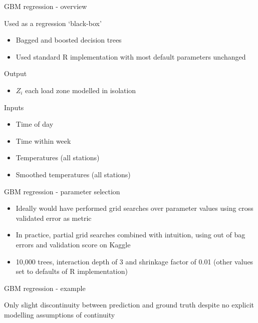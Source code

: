 \begin{frame}{GBM regression - overview}
  \begin{block}{Used as a regression `black-box'}
    \begin{itemize}
      \item Bagged and boosted decision trees
      \item Used standard R implementation with most default parameters unchanged
    \end{itemize}
  \end{block}
  \begin{block}{Output}
  	\begin{itemize}
      \item $Z_i$ \ie each load zone modelled in isolation
    \end{itemize}
  \end{block}
  \begin{block}{Inputs}
    \begin{itemize}
      \item Time of day
      \item Time within week
      \item Temperatures (all stations)
      \item Smoothed temperatures (all stations)
    \end{itemize}
  \end{block}
\end{frame}

\begin{frame}{GBM regression - parameter selection}
  \begin{itemize}
    \item Ideally would have performed grid searches over parameter values using cross validated error as metric
    \vspace{\baselineskip}
    \item In practice, partial grid searches combined with intuition, using out of bag errors and validation score on Kaggle
    \vspace{\baselineskip}
    \item 10,000 trees, interaction depth of 3 and shrinkage factor of 0.01 (other values set to defaults of R implementation)
  \end{itemize}
\end{frame}

\begin{frame}{GBM regression - example}
  \vspace{-2\baselineskip}
  \begin{center}
    
  \end{center}
  \vspace{-1\baselineskip}
  Only slight discontinuity between prediction and ground truth despite no explicit modelling assumptions of continuity
\end{frame}

